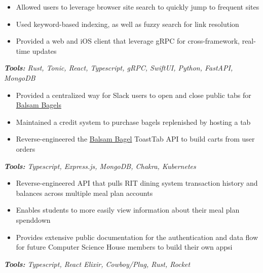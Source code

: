 \begin{itemize}
\item Allowed users to leverage browser site search to quickly jump to frequent sites
\item Used keyword-based indexing, as well as fuzzy search for link resolution
\item Provided a web and iOS client that leverage gRPC for cross-framework, real-time updates
\end{itemize}
\textit{\textbf{Tools:} Rust, Tonic, React, Typescript, gRPC, SwiftUI, Python, FastAPI, MongoDB}

\divider

\begin{itemize}
\item Provided a centralized way for Slack users to open and close public tabs for \href{https://www.balsambagels.com}{Balsam Bagels}
\item Maintained a credit system to purchase bagels replenished by hosting a tab
\item Reverse-engineered the \href{https://www.balsambagels.com}{Balsam Bagel} ToastTab API to build carts from user orders
\end{itemize}
\textit{\textbf{Tools:} Typescript, Express.js, MongoDB, Chakra, Kubernetes}

\divider

\begin{itemize}
\item Reverse-engineered API that pulls RIT dining system transaction history and balances across multiple meal plan accounts
\item Enables students to more easily view information about their meal plan spenddown
\item Provides extensive public documentation for the authentication and data flow for future Computer Science House members to build their own appsi
\end{itemize}
\textit{\textbf{Tools:} Typescript, React Elixir, Cowboy/Plug, Rust, Rocket}